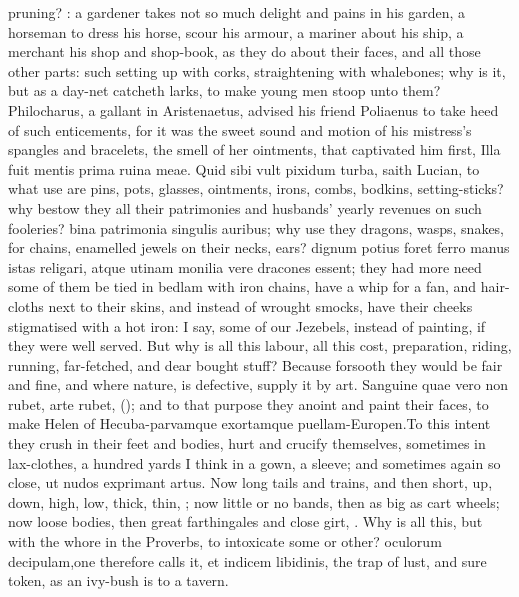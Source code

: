 pruning? : a gardener
takes not so much delight and pains in his garden, a horseman to dress
his horse, scour his armour, a mariner about his ship, a merchant his
shop and shop-book, as they do about their faces, and all those other
parts: such setting up with corks, straightening with whalebones; why
is it, but as a day-net catcheth larks, to make young men stoop unto
them? Philocharus, a gallant in Aristenaetus, advised his friend
Poliaenus to take heed of such enticements, for it was the sweet
sound and motion of his mistress's spangles and bracelets, the smell of
her ointments, that captivated him first, Illa fuit mentis prima ruina
meae. Quid sibi vult pixidum turba, saith Lucian, to what use are
pins, pots, glasses, ointments, irons, combs, bodkins, setting-sticks?
why bestow they all their patrimonies and husbands' yearly revenues on
such fooleries? bina patrimonia singulis auribus; why use they
dragons, wasps, snakes, for chains, enamelled jewels on their necks,
ears? dignum potius foret ferro manus istas religari, atque utinam
monilia vere dracones essent; they had more need some of them be tied
in bedlam with iron chains, have a whip for a fan, and hair-cloths next
to their skins, and instead of wrought smocks, have their cheeks
stigmatised with a hot iron: I say, some of our Jezebels, instead of
painting, if they were well served. But why is all this labour, all
this cost, preparation, riding, running, far-fetched, and dear bought
stuff? Because forsooth they would be fair and fine, and where
nature, is defective, supply it by art. Sanguine quae vero non
rubet, arte rubet, (\Ovid); and to that purpose they anoint and paint
their faces, to make Helen of Hecuba-parvamque exortamque
puellam-Europen.To this intent they crush in their feet and
bodies, hurt and crucify themselves, sometimes in lax-clothes, a
hundred yards I think in a gown, a sleeve; and sometimes again so
close, ut nudos exprimant artus. Now long tails and trains, and
then short, up, down, high, low, thick, thin, \etc{}; now little or no
bands, then as big as cart wheels; now loose bodies, then great
farthingales and close girt, \etc{}. Why is all this, but with the whore in
the Proverbs, to intoxicate some or other? oculorum decipulam,one
therefore calls it, et indicem libidinis, the trap of lust, and sure
token, as an ivy-bush is to a tavern.

